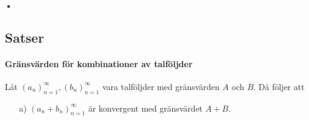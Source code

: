 \paragraph{•}

\subsection{Satser}

\paragraph{Gränsvärden för kombinationer av talföljder}

Låt $\left(a_n\right)_{n = 1}^\infty, \left(b_n\right)_{n = 1}^\infty$ vara talföljder med gränsvärden $A$ och $B$. Då följer att
\begin{enumerate}
	\item[a)] $\left(a_n + b_n\right)_{n = 1}^\infty$ är konvergent med gränsvärdet $A + B$.
\end{enumerate}